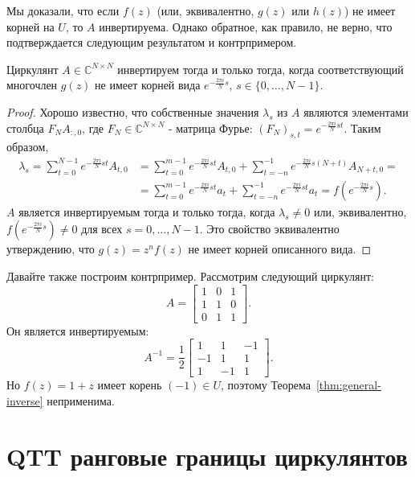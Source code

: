 Мы доказали, что если $f(z)$ (или, эквивалентно, $g(z)$ или $h(z)$) не имеет корней на $U$, то $A$ инвертируема.
Однако обратное, как правило, не верно, что подтверждается следующим результатом и контрпримером.
\begin{proposition}
	Циркулянт $A \in \mathbb{C}^{N\times N}$ инвертируем тогда и только тогда, когда соответствующий многочлен $g(z)$ не имеет корней вида $e^{-\frac{2 \pi i}{N}s}$, $s \in \{0, \dots, N-1\}$.
\end{proposition}
\begin{proof}
	Хорошо известно, что собственные значения $\lambda_s$ из $A$ являются элементами столбца $F_N A_{:,0}$, где $F_N \in \mathbb{C}^{N\times N}$ - матрица Фурье: $(F_N)_{s,t} = e^{-\frac{2 \pi i}{N}st}$.
	Таким образом,
	\begin{align*}
	\lambda_s = \sum_{t=0}^{N-1}e^{-\frac{2 \pi i}{N}st} A_{t,0}
	&=
	\sum_{t=0}^{m-1}e^{-\frac{2 \pi i}{N}st} A_{t,0}
	+
	\sum_{t=-n}^{-1}e^{-\frac{2 \pi i}{N}s(N+t)} A_{N+t,0}
	= \\ &=
	\sum_{t=0}^{m-1}e^{-\frac{2 \pi i}{N}st} a_t
	+
	\sum_{t=-n}^{-1}e^{-\frac{2 \pi i}{N}st} a_t
	=
	f(e^{-\frac{2 \pi i}{N}s}).
	\end{align*}
	$A$ является инвертируемым тогда и только тогда, когда $\lambda_s \neq 0$ или, эквивалентно, $f(e^{-\frac{2 \pi i}{N}s}) \neq 0$ для всех $s = 0, \dots, N-1$.
	Это свойство эквивалентно утверждению, что $g(z) = z^nf(z)$ не имеет корней описанного вида.
\end{proof}
\begin{example}
	Давайте также построим контрпример. Рассмотрим следующий циркулянт:
	\[
	A = \begin{bmatrix}
	1 & 0 & 1 \\
	1 & 1 & 0 \\
	0 & 1 & 1
	\end{bmatrix}.
	\]
	Он является инвертируемым:
	\[
	A^{-1} = \frac{1}{2}
	\begin{bmatrix}
	1 & 1  & -1 \\
	-1& 1  & 1 \\
	1 & -1 & 1
	\end{bmatrix}.
	\]
	Но $f(z) = 1 + z$ имеет корень $(-1) \in U$, поэтому Теорема~\ref{thm:general-inverse} неприменима.
\end{example}

\section{QTT ранговые границы циркулянтов}\label{sec:qtt_ranks}

